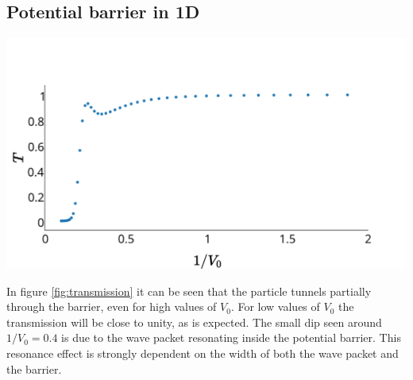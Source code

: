 \subsection*{Potential barrier in 1D}
\begin{Figure}
    \centering
    \includegraphics[width=\linewidth]{transmission_1d_pot_barrier.pdf}
    \label{fig:transmission}
\end{Figure} In figure \ref{fig:transmission} it can be seen that the particle tunnels partially through the barrier, even for high values of $V_0$. For low values of $V_0$ the transmission will be close to unity, as is expected. The small dip seen around $1/V_0=0.4$ is due to the wave packet resonating inside the potential barrier. This resonance effect is strongly dependent on the width of both the wave packet and the barrier.

